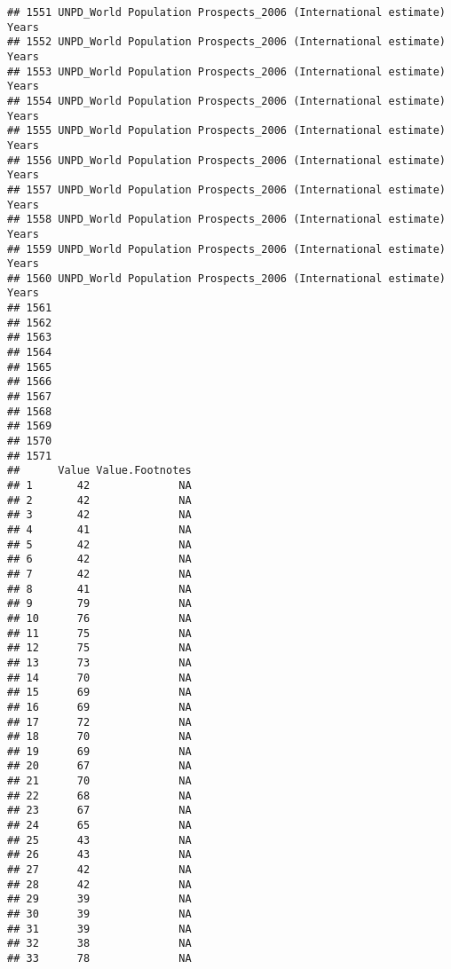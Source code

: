 \documentclass[]{article}
\begin{document}
\begin{verbatim}
## 1551 UNPD_World Population Prospects_2006 (International estimate) Years
## 1552 UNPD_World Population Prospects_2006 (International estimate) Years
## 1553 UNPD_World Population Prospects_2006 (International estimate) Years
## 1554 UNPD_World Population Prospects_2006 (International estimate) Years
## 1555 UNPD_World Population Prospects_2006 (International estimate) Years
## 1556 UNPD_World Population Prospects_2006 (International estimate) Years
## 1557 UNPD_World Population Prospects_2006 (International estimate) Years
## 1558 UNPD_World Population Prospects_2006 (International estimate) Years
## 1559 UNPD_World Population Prospects_2006 (International estimate) Years
## 1560 UNPD_World Population Prospects_2006 (International estimate) Years
## 1561                                                                    
## 1562                                                                    
## 1563                                                                    
## 1564                                                                    
## 1565                                                                    
## 1566                                                                    
## 1567                                                                    
## 1568                                                                    
## 1569                                                                    
## 1570                                                                    
## 1571                                                                    
##      Value Value.Footnotes
## 1       42              NA
## 2       42              NA
## 3       42              NA
## 4       41              NA
## 5       42              NA
## 6       42              NA
## 7       42              NA
## 8       41              NA
## 9       79              NA
## 10      76              NA
## 11      75              NA
## 12      75              NA
## 13      73              NA
## 14      70              NA
## 15      69              NA
## 16      69              NA
## 17      72              NA
## 18      70              NA
## 19      69              NA
## 20      67              NA
## 21      70              NA
## 22      68              NA
## 23      67              NA
## 24      65              NA
## 25      43              NA
## 26      43              NA
## 27      42              NA
## 28      42              NA
## 29      39              NA
## 30      39              NA
## 31      39              NA
## 32      38              NA
## 33      78              NA

\end{verbatim}
\end{document}
